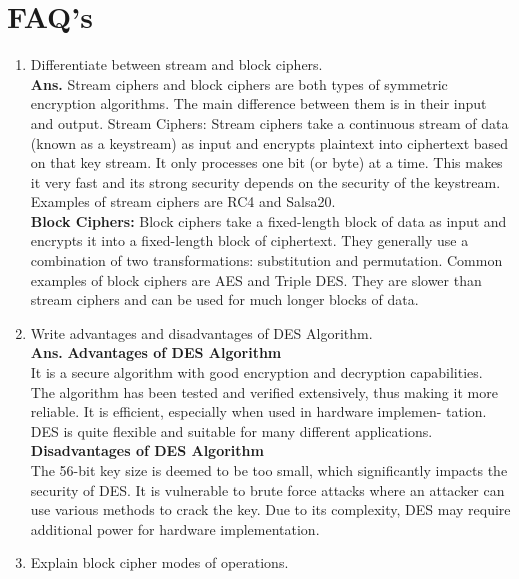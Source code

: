\documentclass{article}
\begin{document}
\section{\textbf{FAQ's}}
\begin{enumerate}
	\item Differentiate between stream and block ciphers.\\
	
	\textbf{Ans.} Stream ciphers and block ciphers are both types of symmetric encryption algorithms. The main difference between them is in their input and output. Stream Ciphers: Stream ciphers take a continuous stream of data (known as a keystream) as input and encrypts plaintext into ciphertext based on that key stream. It only processes one bit (or byte) at a time. This makes it very fast and its strong security depends on the security of the keystream. Examples of stream ciphers are RC4 and Salsa20.\\
	
	\textbf{Block Ciphers:} Block ciphers take a fixed-length block of data as input and encrypts it into a fixed-length block of ciphertext. They generally use a combination of two transformations: substitution and permutation. Common examples of block ciphers are AES and Triple DES. They are slower than stream ciphers and can be used for much longer blocks of data.
	
	\item Write advantages and disadvantages of DES Algorithm.\\
	
	\textbf{Ans.} \textbf{Advantages of DES Algorithm}\\
	It is a secure algorithm with good encryption and decryption capabilities. The algorithm has been tested and verified extensively, thus making it more reliable. It is efficient, especially when used in hardware implemen- tation. DES is quite flexible and suitable for many different applications.\\
	
	\textbf{Disadvantages of DES Algorithm}\\
	The 56-bit key size is deemed to be too small, which significantly impacts the security of DES. It is vulnerable to brute force attacks where an attacker can use various methods to crack the key. Due to its complexity, DES may require additional power for hardware implementation.
	
	\item Explain block cipher modes of operations.\\
	

\end{enumerate}
\end{document}
